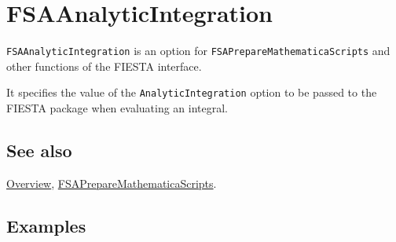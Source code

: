 \documentclass[../FeynHelpersManual.tex]{subfiles}
\begin{document}
\begin{Shaded}
\begin{Highlighting}[]
 
\end{Highlighting}
\end{Shaded}

\hypertarget{fsaanalyticintegration}{
\section{FSAAnalyticIntegration}\label{fsaanalyticintegration}}

\texttt{FSAAnalyticIntegration} is an option for
\texttt{FSAPrepareMathematicaScripts} and other functions of the FIESTA
interface.

It specifies the value of the \texttt{AnalyticIntegration} option to be
passed to the FIESTA package when evaluating an integral.

\subsection{See also}

\hyperlink{toc}{Overview},
\hyperlink{fsapreparemathematicascripts}{FSAPrepareMathematicaScripts}.

\subsection{Examples}
\end{document}
